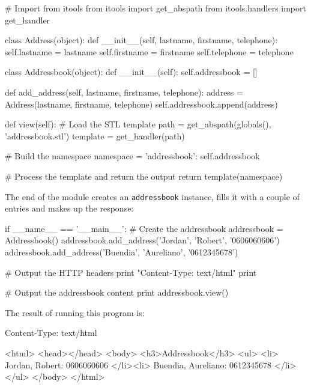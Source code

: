 \begin{code}
    # Import from itools
    from itools import get_abspath
    from itools.handlers import get_handler

    class Address(object):
        def __init__(self, lastname, firstname, telephone):
            self.lastname = lastname
            self.firstname = firstname
            self.telephone = telephone

    class Addressbook(object):
        def __init__(self):
            self.addressbook = []

        def add_address(self, lastname, firstname, telephone):
            address = Address(lastname, firstname, telephone)
            self.addressbook.append(address)

        def view(self):
            # Load the STL template
            path = get_abspath(globals(), 'addressbook.stl')
            template = get_handler(path)

            # Build the namespace
            namespace = {'addressbook': self.addressbook}

            # Process the template and return the output
            return template(namespace)
\end{code}

The end of the module creates an {\tt addressbook} instance, fills it with
a couple of entries and makes up the response:

\begin{code}
    if __name__ == '__main__':
        # Create the addressbook
        addressbook = Addressbook()
        addressbook.add_address('Jordan', 'Robert', '0606060606')
        addressbook.add_address('Buendia', 'Aureliano', '0612345678')

        # Output the HTTP headers
        print "Content-Type: text/html"
        print

        # Output the addressbook content
        print addressbook.view()
\end{code}

The result of running this program is:

\begin{code}
    Content-Type: text/html

    <html>
      <head></head>
      <body>
        <h3>Addressbook</h3>
        <ul>
          <li>
            Jordan,
            Robert:
            0606060606
          </li><li>
            Buendia,
            Aureliano:
            0612345678
          </li>
        </ul>
      </body>
    </html>
\end{code}





